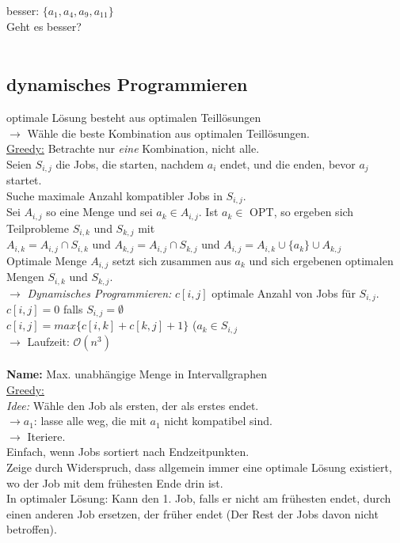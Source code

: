 besser: $\lbrace a_1, a_4, a_9, a_11 \rbrace$\\
Geht es besser?\\
\ \\
\subsection{dynamisches Programmieren}
optimale Lösung besteht aus optimalen Teillösungen\\
$\rightarrow$ Wähle die beste Kombination aus optimalen Teillösungen.\\
\underline{Greedy:} Betrachte nur \emph{eine} Kombination, nicht alle.\\
Seien $S_{i, j}$ die Jobs, die starten, nachdem $a_i$ endet, und die enden, bevor $a_j$ startet.\\
Suche maximale Anzahl kompatibler Jobs in $S_{i, j}$.\\
Sei $A_{i, j}$ so eine Menge und sei $a_k \in A_{i, j}$. Ist $a_k \in$ OPT, so ergeben sich Teilprobleme $S_{i, k}$ und $S_{k, j}$ mit \\
$A_{i, k} = A_{i, j} \cap S_{i, k}$ und $A_{k, j} = A_{i, j} \cap S_{k, j}$ und $A_{i, j} = A_{i, k} \cup \lbrace a_k \rbrace \cup A_{k, j}$\\
Optimale Menge $A_{i, j}$ setzt sich zusammen aus $a_k$ und sich ergebenen optimalen Mengen $S_{i, k}$ und $S_{k, j}$.\\
$\rightarrow$ \emph{Dynamisches Programmieren:} $c[i, j]$ optimale Anzahl von Jobs für $S_{i, j}$.\\
$c[i, j] = 0$ falls $S_{i, j} = \emptyset$\\
$c[i, j] = max\lbrace c[i, k] + c[k, j] +1 \rbrace$ ($a_k \in S_{i, j}$\\
$\rightarrow$ Laufzeit: $\mathcal O(n^3)$\\
\ \\
\textbf{Name:} Max. unabhängige Menge in Intervallgraphen\\
\underline{Greedy:} \\
\emph{Idee: } Wähle den Job als ersten, der als erstes endet.\\
$\rightarrow a_1$: lasse alle weg, die mit $a_1$ nicht kompatibel sind.\\
$\rightarrow$ Iteriere.\\
Einfach, wenn Jobs sortiert nach Endzeitpunkten.\\
Zeige durch Widerspruch, dass allgemein immer eine optimale Lösung existiert, wo der Job mit dem frühesten Ende drin ist.\\
In optimaler Lösung: Kann den 1. Job, falls er nicht am frühesten endet, durch einen anderen Job ersetzen, der früher endet (Der Rest der Jobs davon nicht betroffen).\\

